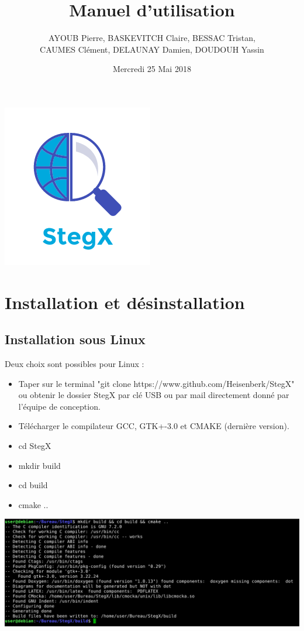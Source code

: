 \documentclass[11pt]{article}
\title{\huge{\textbf Manuel d'utilisation}}
\author{AYOUB Pierre, BASKEVITCH Claire, BESSAC Tristan, \\
CAUMES Clément, DELAUNAY Damien, DOUDOUH Yassin}
\date{Mercredi 25 Mai 2018}
\begin{document}
\maketitle
\vspace{20em}
\begin{center}\includegraphics{pictures/Application.png}\end{center}
\newpage

\tableofcontents

\newpage

\section{Installation et désinstallation}

\subsection{Installation sous Linux}

Deux choix sont possibles pour Linux :

\begin{itemize}
\item Taper sur le terminal "git clone https://www.github.com/Heisenberk/StegX"
ou obtenir le dossier StegX par clé USB ou par mail directement donné par 
l'équipe de conception. 
\item Télécharger le compilateur GCC, GTK+-3.0 et CMAKE (dernière version).
\item cd StegX
\item mkdir build 
\item cd build
\item cmake ..
\end{itemize}

\hspace{1cm}
\includegraphics[scale=0.5]{pictures/build.png}
\vspace{0.5cm}
\end{document}
